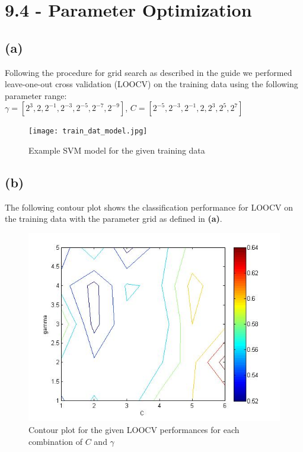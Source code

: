 \documentclass[11pt,a4paper]{article}
\begin{document}
\section*{9.4 - Parameter Optimization}
\subsection*{(a)}
Following the procedure for grid search as described in the guide we performed leave-one-out cross validation (LOOCV) on the training data using the following parameter range:\\
$ \gamma = [2^{3},2,2^{-1},2^{-3},2^{-5},2^{-7},2^{-9}] $, $ C = [2^{-5},2^{-3},2^{-1},2,2^{3},2^{5},2^{7}]$

\begin{figure}[h]
	\texttt{[image: train\_dat\_model.jpg]}
	\caption{Example SVM model for the given training data}
\end{figure}

\subsection*{(b)}
The following contour plot shows the classification performance for LOOCV on the training data with the parameter grid as defined in \textbf{(a)}.

\begin{figure}[h]
	\includegraphics[width=\linewidth]{perf_contour.jpg}
	\caption{Contour plot for the given LOOCV performances for each combination of $C$ and $\gamma$}
\end{figure}

\newpage
\end{document}
